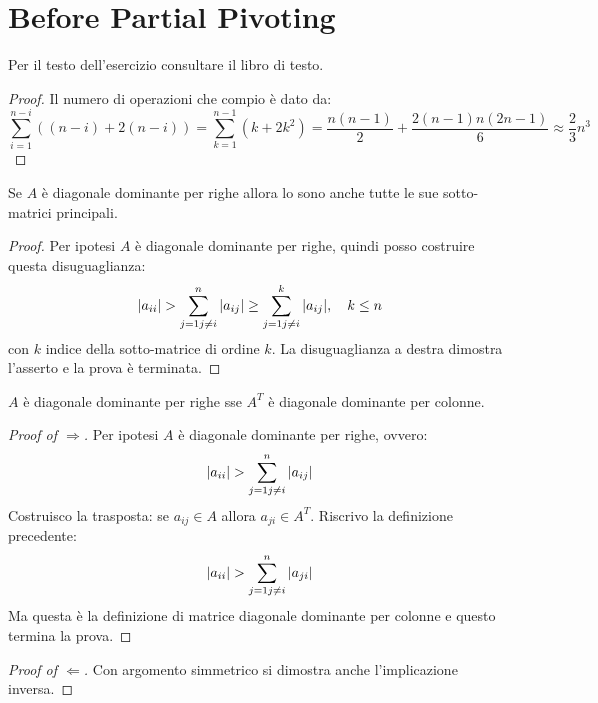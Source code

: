 \section{Before Partial Pivoting}

\begin{exercise}[3.6]
Per il testo dell'esercizio consultare il libro di testo.
\end{exercise}
\begin{proof}
Il numero di operazioni che compio \`e dato da:
\begin{displaymath}
\sum_{i = 1}^{n - i}{\left( (n-i) + 2(n-i) \right)} =
\sum_{k = 1}^{n - 1}{\left( k + 2k^{2} \right)} = \frac{n(n-1)}{2} +
\frac{2(n-1)n(2n-1)}{6} \approx \frac{2}{3}n^{3}
\end{displaymath}
\end{proof}

\begin{exercise}[3.9, Lemma 3.4]
Se $A$ \`e diagonale dominante per righe allora lo sono anche tutte le sue
sotto-matrici principali.
\end{exercise}
\begin{proof}
Per ipotesi $A$ \`e diagonale dominante per righe, quindi posso costruire questa 
disuguaglianza:
\begin{displaymath}
|a_{ii}| > \sum_{j = 1 \\j \not = i}^{n}{|a_{ij}|} \geq \sum_{j = 1 \\j \not =
i}^{k}{|a_{ij}|}, \quad k \leq n
\end{displaymath}
con $k$ indice della sotto-matrice di ordine $k$. La disuguaglianza a destra
dimostra l'asserto e la prova \`e terminata.
\end{proof}

\begin{exercise}[3.9, Lemma 3.5]
$A$ \`e diagonale dominante per righe sse $A^{T}$ \`e diagonale dominante per
colonne.
\end{exercise}
\begin{proof}[Proof of $\Rightarrow$]
Per ipotesi $A$ \`e diagonale dominante per righe, ovvero:
\begin{displaymath}
|a_{ii}| > \sum_{j = 1 \\j \not = i}^{n}{|a_{ij}|}
\end{displaymath}
Costruisco la trasposta: se $a_{ij} \in A$ allora $a_{ji} \in A^{T}$. Riscrivo
la definizione precedente:
\begin{displaymath}
|a_{ii}| > \sum_{j = 1 \\j \not = i}^{n}{|a_{ji}|}
\end{displaymath}
Ma questa \`e la definizione di matrice diagonale dominante per colonne e questo
termina la prova.
\end{proof}

\begin{proof}[Proof of $\Leftarrow$]
Con argomento simmetrico si dimostra anche l'implicazione inversa.
\end{proof}